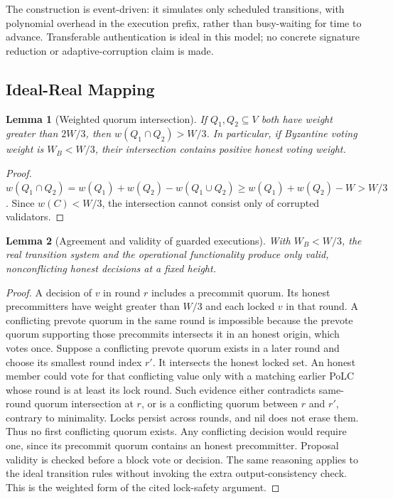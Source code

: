 \documentclass[conference,letterpaper,10pt]{IEEEtran}
\newtheorem{lemma}{Lemma}
\begin{document}
The construction is event-driven: it simulates only scheduled transitions, with polynomial overhead in the execution prefix, rather than busy-waiting for time to advance. Transferable authentication is ideal in this model; no concrete signature reduction or adaptive-corruption claim is made.

\subsection{Ideal-Real Mapping}

\begin{lemma}[Weighted quorum intersection]\label{lem:weighted-intersection}
If $Q_1,Q_2\subseteq V$ both have weight greater than $2W/3$, then $w(Q_1\cap Q_2)>W/3$. In particular, if Byzantine voting weight is $W_B<W/3$, their intersection contains positive honest voting weight.
\end{lemma}
\begin{proof}
$w(Q_1\cap Q_2)=w(Q_1)+w(Q_2)-w(Q_1\cup Q_2)\geq w(Q_1)+w(Q_2)-W>W/3$. Since $w(C)<W/3$, the intersection cannot consist only of corrupted validators.
\end{proof}

\begin{lemma}[Agreement and validity of guarded executions]\label{lem:guarded-safety}
With $W_B<W/3$, the real transition system and the operational functionality produce only valid, nonconflicting honest decisions at a fixed height.
\end{lemma}
\begin{proof}
A decision of $v$ in round $r$ includes a precommit quorum. Its honest precommitters have weight greater than $W/3$ and each locked $v$ in that round. A conflicting prevote quorum in the same round is impossible because the prevote quorum supporting those precommits intersects it in an honest origin, which votes once. Suppose a conflicting prevote quorum exists in a later round and choose its smallest round index $r'$. It intersects the honest locked set. An honest member could vote for that conflicting value only with a matching earlier PoLC whose round is at least its lock round. Such evidence either contradicts same-round quorum intersection at $r$, or is a conflicting quorum between $r$ and $r'$, contrary to minimality. Locks persist across rounds, and nil does not erase them. Thus no first conflicting quorum exists. Any conflicting decision would require one, since its precommit quorum contains an honest precommitter. Proposal validity is checked before a block vote or decision. The same reasoning applies to the ideal transition rules without invoking the extra output-consistency check. This is the weighted form of the cited lock-safety argument.
\end{proof}
\end{document}
